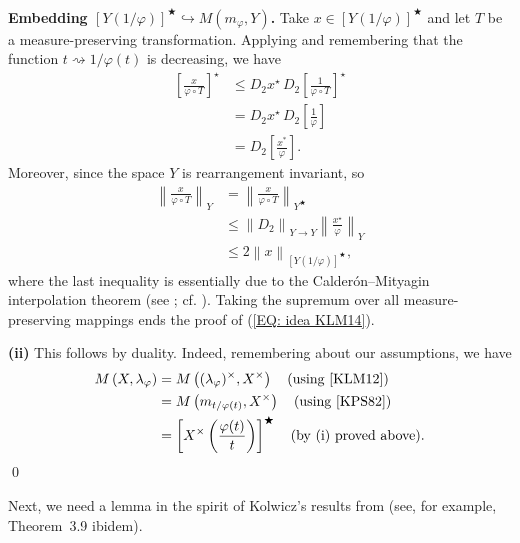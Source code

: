 \documentclass[11pt]{amsart}
\theoremstyle{definition}
\theoremstyle{definition}
\theoremstyle{definition}
\theoremstyle{definition}
\theoremstyle{definition}
\theoremstyle{definition}
\theoremstyle{definition}
\theoremstyle{definition}
\numberwithin{equation}{section}
\numberwithin{equation}{section}
\numberwithin{equation}{section}
\theoremstyle{definition}
\theoremstyle{definition}
\theoremstyle{definition}
\theoremstyle{definition}
\theoremstyle{definition}
\theoremstyle{definition}
\newcommand{\norm}[1]{\left\lVert#1\right\rVert}
\renewenvironment{proof}{\noindent {\bf Proof.}}{\qed}
\begin{document}
\begin{proof}
			{\bf Embedding $\left[ Y\left( 1 / \varphi \right) \right]^{\bigstar} \hookrightarrow M(m_{\varphi},Y)$.}
			Take $x \in \left[ Y\left( 1 / \varphi \right) \right]^{\bigstar}$ and let $T$ be a measure-preserving transformation.
			Applying \cite[Property~$10^{\circ}$, p.~67]{KPS82} and remembering that the function $t \rightsquigarrow 1 / \varphi(t)$
			is decreasing, we have
			\begin{align*}
				\left[ \frac{x}{\varphi \circ T} \right]^{\star}
					& \leqslant D_2 x^{\star} \, D_2 \left[ \frac{1}{\varphi \circ T} \right]^{\star}  \\
					& = D_2 x^{\star} \, D_2\left[ \frac{1}{\varphi} \right] \\
					& = D_2\left[ \frac{x^*}{\varphi} \right].
			\end{align*}
			Moreover, since the space $Y$ is rearrangement invariant, so
			\begin{align*}
				\norm{\frac{x}{\varphi \circ T}}_Y 
					& = \norm{ \frac{x}{\varphi \circ T} }_{Y^{\bigstar}} \\
					& \leqslant \norm{D_2}_{Y \rightarrow Y} \norm{\frac{x^{\star}}{\varphi}}_Y \\
					& \leqslant 2 \norm{x}_{\left[ Y\left( 1 / \varphi \right) \right]^{\bigstar}},
			\end{align*}
			where the last inequality is essentially due to the Calder{\' o}n--Mityagin interpolation theorem (see \cite[p.~130]{LT79}; cf. \cite[pp.~96--98]{KPS82}).
			Taking the supremum over all measure-preserving mappings ends the proof of (\ref{EQ: idea KLM14}).
			
			{\bf (ii)} This follows by duality. Indeed, remembering about our assumptions, we have
			\begin{align*}
				M\left( X, \lambda_{\varphi} \right) & = M\left( (\lambda_{\varphi})^{\times}, X^{\times} \right) \quad \text{(using \cite[Property~(vii), p.~879]{KLM12})} \\
					& = M\left( m_{t/\varphi(t)}, X^{\times} \right) \quad \text{(using \cite[Theorem~5.2, p.~112]{KPS82})} \\
					& = \left[ X^{\times}\left( \frac{\varphi(t)}{t} \right) \right]^{\bigstar} \quad \text{(by (i) proved above)}.
			\end{align*}
		\end{proof}
	
		Next, we need a lemma in the spirit of Kolwicz's results from \cite{Kol16} (see, for example, Theorem~3.9 ibidem).
	
\end{document}
